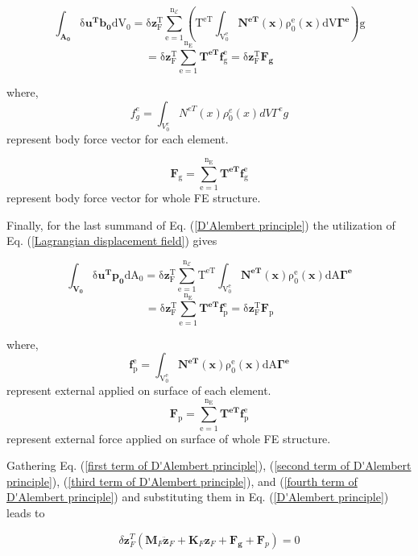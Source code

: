 \begin{equation}
\mathrm{\mathrm{\int_{\mathbf{A_{0}}}\delta\mathbf{u^{T}}\mathbf{b_{0}}dV_{0}=\delta\mathbf{z}_{F}^{T}\sum_{e=1}^{n_{\mathcal{E}}}(T^{eT}\int_{V_{0}^{e}}\mathbf{N^{eT}}(\mathbf{x})\rho_{0}^{e}(\mathbf{x})dV\mathbf{\Gamma^{e}})g}}
\end{equation}
\begin{equation}
\mathrm{\mathrm{=\delta\mathbf{z}_{F}^{T}\sum_{e=1}^{n_{E}}\mathbf{T^{eT}}\mathbf{f}_{g}^{e}=\delta\mathbf{z}_{F}^{T}\mathbf{F_{g}}}}\label{third term of D'Alembert principle}
\end{equation}

where,
\[
f_{g}^{e} = \int_{V_{0}^{e}} N^{eT}(x) \rho_{0}^{e}(x) dV \Gamma^{e}g
\]
represent body force vector for each element.

\[
\mathrm{\mathbf{F}_{g}=\sum_{e=1}^{n_{E}}\mathbf{T^{eT}}\mathbf{f}_{g}^{e}}
\]
represent body force vector for whole FE structure.

Finally, for the last summand of Eq. (\ref{D'Alembert principle})
the utilization of Eq. (\ref{Lagrangian displacement field}) gives

\begin{equation}
\mathrm{\int_{\mathbf{V_{0}}}\delta\mathbf{u^{T}}\mathbf{p_{0}}dA_{0}=\delta\mathbf{z}_{F}^{T}\sum_{e=1}^{n_{\mathcal{E}}}T^{eT}\int_{V_{0}^{e}}\mathbf{N^{eT}}(\mathbf{x})\rho_{0}^{e}(\mathbf{x})dA\mathbf{\Gamma^{e}}}
\end{equation}
\begin{equation}
\mathrm{\mathrm{=\delta\mathbf{z}_{F}^{T}\sum_{e=1}^{n_{E}}\mathbf{T^{eT}}\mathbf{f}_{p}^{e}=\delta\mathbf{z}_{F}^{T}\mathbf{F}_{p}}}\label{fourth term of D'Alembert principle}
\end{equation}


where,
\[
\mathrm{\mathbf{f}_{p}^{e}=\int_{V_{0}^{e}}\mathbf{N^{eT}}(\mathbf{x})\rho_{0}^{e}(\mathbf{x})dA\mathbf{\Gamma^{e}}}
\]
represent external applied on surface of each element.
\[
\mathrm{\mathbf{F}_{p}=\sum_{e=1}^{n_{E}}\mathbf{T^{eT}}\mathbf{f}_{p}^{e}}
\]
represent external force applied on surface of whole FE structure.

Gathering Eq. (\ref{first term of D'Alembert principle}), (\ref{second term of D'Alembert principle}),
(\ref{third term of D'Alembert principle}), and (\ref{fourth term of D'Alembert principle})
and substituting them in Eq. (\ref{D'Alembert principle}) leads to 

\begin{equation}
\delta\mathbf{z}_{F}^{T}(\mathbf{M}_{F}\ddot{\boldsymbol{z}}_{F}+\mathbf{K}_{F}\mathbf{z}_{F}+\mathbf{F_{g}}+\mathbf{F}_{p})=0\label{LTI equation of motion ... undamped}
\end{equation}


